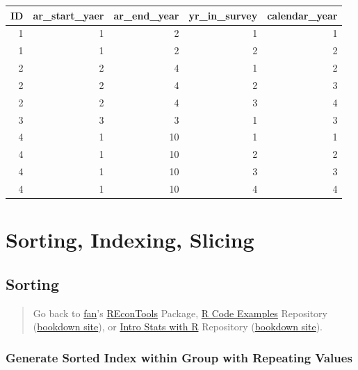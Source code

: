 \documentclass[
]{book}
\begin{document}
\begin{table}[!h]
\centering
\begin{tabular}{r|r|r|r|r}
\hline
ID & ar\_start\_yaer & ar\_end\_year & yr\_in\_survey & calendar\_year\\
\hline
\rowcolor{gray!6}  1 & 1 & 2 & 1 & 1\\
\hline
1 & 1 & 2 & 2 & 2\\
\hline
\rowcolor{gray!6}  2 & 2 & 4 & 1 & 2\\
\hline
2 & 2 & 4 & 2 & 3\\
\hline
\rowcolor{gray!6}  2 & 2 & 4 & 3 & 4\\
\hline
3 & 3 & 3 & 1 & 3\\
\hline
\rowcolor{gray!6}  4 & 1 & 10 & 1 & 1\\
\hline
4 & 1 & 10 & 2 & 2\\
\hline
\rowcolor{gray!6}  4 & 1 & 10 & 3 & 3\\
\hline
4 & 1 & 10 & 4 & 4\\
\hline
\end{tabular}
\end{table}

\hypertarget{sorting-indexing-slicing}{%
\section{Sorting, Indexing, Slicing}\label{sorting-indexing-slicing}}

\hypertarget{sorting}{%
\subsection{Sorting}\label{sorting}}

\begin{quote}
Go back to \href{http://fanwangecon.github.io/}{fan}'s \href{https://fanwangecon.github.io/REconTools/}{REconTools} Package, \href{https://fanwangecon.github.io/R4Econ/}{R Code Examples} Repository (\href{https://fanwangecon.github.io/R4Econ/bookdown}{bookdown site}), or \href{https://fanwangecon.github.io/Stat4Econ/}{Intro Stats with R} Repository (\href{https://fanwangecon.github.io/Stat4Econ/bookdown}{bookdown site}).
\end{quote}

\hypertarget{generate-sorted-index-within-group-with-repeating-values}{%
\subsubsection{Generate Sorted Index within Group with Repeating Values}\label{generate-sorted-index-within-group-with-repeating-values}}
\end{document}
